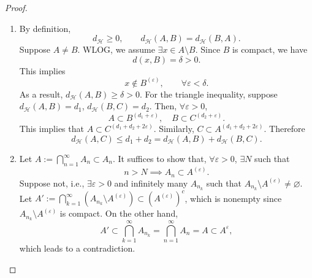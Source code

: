 \begin{proof}
\begin{enumerate}[label=(\roman*)]
    \item By definition, \[d_{\mathcal{H}}\geq 0,\qquad d_{\mathcal{H}}(A,B)=d_{\mathcal{H}}(B,A).\]
    Suppose $A\neq B$. WLOG, we assume $\exists x \in A\setminus B$. Since $B$ is compact, we have \[d(x,B)=\delta>0.\]
    This implies \[x \not\in B^{(\varepsilon)},\qquad \forall \varepsilon<\delta.\]
    As a result, $d_{\mathcal{H}}(A,B)\geq \delta>0$.
    For the triangle inequality, suppose $d_{\mathcal{H}}(A,B)=d_{1}$, $d_{\mathcal{H}}(B,C)=d_{2}$. Then, $\forall \varepsilon>0$, 
    \[A\subset B^{(d_{1}+\varepsilon)},\quad B\subset C^{(d_{2}+\varepsilon)}.\]
    This implies that $A\subset C^{(d_{1}+d_{2}+2\varepsilon)}$. 
    Similarly, $C\subset A^{(d_{1}+d_{2}+2\varepsilon)}$. Therefore 
    \[d_{\mathcal{H}}(A,C)\leq d_{1}+d_{2}=d_{\mathcal{H}}(A,B)+d_{\mathcal{H}}(B,C).\]
   
    \item Let $\displaystyle A:=\bigcap _{n=1}^{\infty}A_{n}\subset A_{n}$. 
    It suffices to show that, $\forall \varepsilon>0$, $\exists N$ such that 
    \[n>N\implies A_{n}\subset A^{(\varepsilon)}.\]
    Suppose not, i.e., $\exists \varepsilon>0$ and infinitely many $A_{n_{k}}$ 
    such that $A_{n_{k}}\setminus A^{(\varepsilon)}\neq \varnothing$. 
    Let $\displaystyle A':=\bigcap _{k=1}^{\infty}(A_{n_{k}}\setminus A^{(\varepsilon)})\subset(A^{(\varepsilon)})^{c}$, 
    which is nonempty since $A_{n_{k}}\setminus A^{(\varepsilon)}$ is compact. On the other hand, 
    \[A'\subset \bigcap _{k=1}^{\infty}A_{n_{k}}=\bigcap _{n=1}^{\infty}A_{n}=A \subset A^{\varepsilon},\] 
    which leads to a contradiction.
    

\end{enumerate}
\end{proof}
